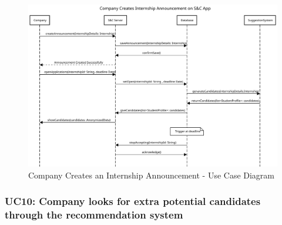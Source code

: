 \begin{figure}[H]
    \centering
    \includegraphics[width=1.0\textwidth]{Images/UC_9.pdf}
    \caption{Company Creates an Internship Announcement - Use Case Diagram}
    \label{fig:use-case-diagram-9}
\end{figure}


\subsubsection{UC10: Company looks for extra potential candidates through the recommendation system}
\label{subsubsec:company-looks-for-extra-potential-candidates-through-the-recommendation-system}

